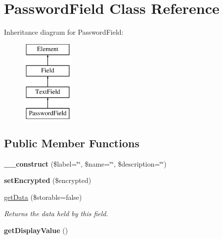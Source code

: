\hypertarget{class_password_field}{
\section{PasswordField Class Reference}
\label{class_password_field}
}
Inheritance diagram for PasswordField:\begin{figure}[H]
\begin{center}
\leavevmode
\includegraphics[height=4.000000cm]{class_password_field}
\end{center}
\end{figure}
\subsection*{Public Member Functions}
\begin{DoxyCompactItemize}
\item 
\hypertarget{class_password_field_ab4525246cf62cca61ab67ff906d76863}{
{\bfseries \_\-\_\-construct} (\$label=\char`\"{}\char`\"{}, \$name=\char`\"{}\char`\"{}, \$description=\char`\"{}\char`\"{})}
\label{class_password_field_ab4525246cf62cca61ab67ff906d76863}

\item 
\hypertarget{class_password_field_aa08bc84d9e46aeeb5a5e79726b65fdca}{
{\bfseries setEncrypted} (\$encrypted)}
\label{class_password_field_aa08bc84d9e46aeeb5a5e79726b65fdca}

\item 
\hyperlink{class_password_field_aa85c5f64b8141c9dafd76de00e5d88dc}{getData} (\$storable=false)
\begin{DoxyCompactList}\small\item\em Returns the data held by this field. \item\end{DoxyCompactList}\item 
\hypertarget{class_password_field_a99fd8d94ae4f45eccd9420e31e0f620e}{
{\bfseries getDisplayValue} ()}
\label{class_password_field_a99fd8d94ae4f45eccd9420e31e0f620e}

\end{DoxyCompactItemize}
